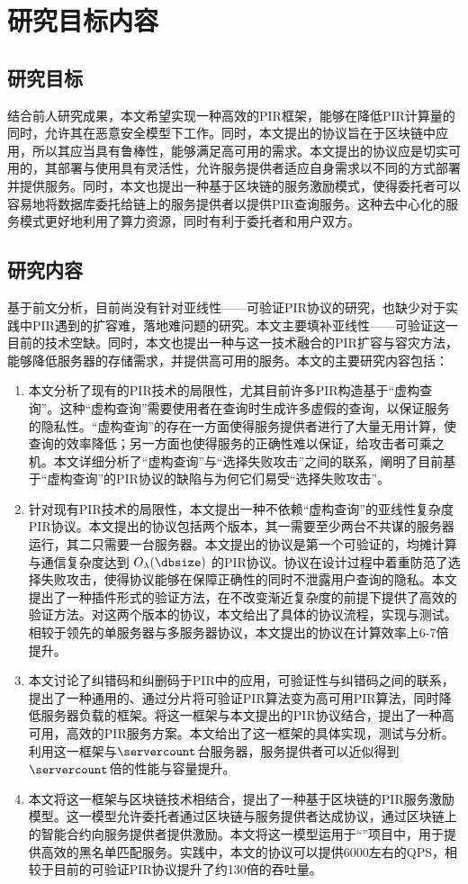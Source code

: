 \section{研究目标内容}

\subsection{研究目标}
结合前人研究成果，本文希望实现一种高效的PIR框架，能够在降低PIR计算量的同时，允许其在恶意安全模型下工作。同时，本文提出的协议旨在于区块链中应用，所以其应当具有鲁棒性，能够满足高可用的需求。本文提出的协议应是切实可用的，其部署与使用具有灵活性，允许服务提供者适应自身需求以不同的方式部署并提供服务。同时，本文也提出一种基于区块链的服务激励模式，使得委托者可以容易地将数据库委托给链上的服务提供者以提供PIR查询服务。这种去中心化的服务模式更好地利用了算力资源，同时有利于委托者和用户双方。

\subsection{研究内容}

基于前文分析，目前尚没有针对亚线性——可验证PIR协议的研究，也缺少对于实践中PIR遇到的扩容难，落地难问题的研究。本文主要填补亚线性——可验证这一目前的技术空缺。同时，本文也提出一种与这一技术融合的PIR扩容与容灾方法，能够降低服务器的存储需求，并提供高可用的服务。本文的主要研究内容包括：
\begin{enumerate}
    \item 本文分析了现有的PIR技术的局限性，尤其目前许多PIR构造基于“虚构查询”。这种“虚构查询”需要使用者在查询时生成许多虚假的查询，以保证服务的隐私性。“虚构查询”的存在一方面使得服务提供者进行了大量无用计算，使查询的效率降低；另一方面也使得服务的正确性难以保证，给攻击者可乘之机。本文详细分析了“虚构查询”与“选择失败攻击”之间的联系，阐明了目前基于“虚构查询”的PIR协议的缺陷与为何它们易受“选择失败攻击”。
    \item 针对现有PIR技术的局限性，本文提出一种不依赖“虚构查询”的亚线性复杂度PIR协议。本文提出的协议包括两个版本，其一需要至少两台不共谋的服务器运行，其二只需要一台服务器。本文提出的协议是第一个可验证的，均摊计算与通信复杂度达到 $O_\lambda(\dbsize)$ 的PIR协议。协议在设计过程中着重防范了选择失败攻击，使得协议能够在保障正确性的同时不泄露用户查询的隐私。本文提出了一种插件形式的验证方法，在不改变渐近复杂度的前提下提供了高效的验证方法。对这两个版本的协议，本文给出了具体的协议流程，实现与测试。相较于领先的单服务器与多服务器协议，本文提出的协议在计算效率上6-7倍提升。
    \item 本文讨论了纠错码和纠删码于PIR中的应用，可验证性与纠错码之间的联系，提出了一种通用的、通过分片将可验证PIR算法变为高可用PIR算法，同时降低服务器负载的框架。将这一框架与本文提出的PIR协议结合，提出了一种高可用，高效的PIR服务方案。本文给出了这一框架的具体实现，测试与分析。利用这一框架与$\servercount$台服务器，服务提供者可以近似得到$\servercount$倍的性能与容量提升。
    \item 本文将这一框架与区块链技术相结合，提出了一种基于区块链的PIR服务激励模型。这一模型允许委托者通过区块链与服务提供者达成协议，通过区块链上的智能合约向服务提供者提供激励。本文将这一模型运用于“\projectname”项目中，用于提供高效的黑名单匹配服务。实践中，本文的协议可以提供6000左右的QPS，相较于目前的可验证PIR协议提升了约130倍的吞吐量。
\end{enumerate}
